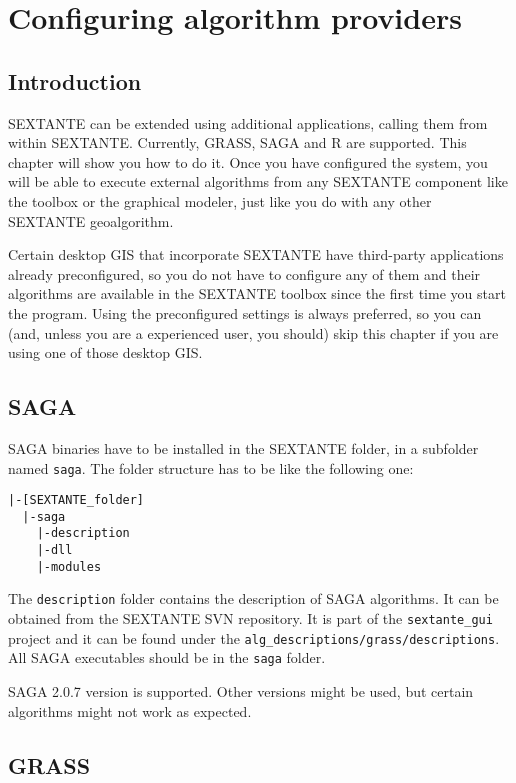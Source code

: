 \chapter{Configuring algorithm providers}

\section{Introduction}

SEXTANTE can be extended using additional applications, calling them from within SEXTANTE. Currently, GRASS, SAGA and R are supported. This chapter will show you how to do it. Once you have configured the system, you will be able to execute external algorithms from any SEXTANTE component like the toolbox or the graphical modeler, just like you do with any other SEXTANTE geoalgorithm.

Certain desktop GIS that incorporate SEXTANTE have third-party applications already preconfigured, so you do not have to configure any of them and their algorithms are available in the SEXTANTE toolbox since the first time you start the program. Using the preconfigured settings is always preferred, so you can (and, unless you are a experienced user, you should) skip this chapter if you are using one of those desktop GIS.


\section{SAGA}

SAGA binaries have to be installed in the SEXTANTE folder, in a subfolder named \texttt{saga}. The folder structure has to be like the following one:

\begin{verbatim}
|-[SEXTANTE_folder] 
  |-saga 
    |-description 
    |-dll 
    |-modules
\end{verbatim}    

The \texttt{description} folder contains the description of SAGA algorithms. It can be obtained from the SEXTANTE SVN repository. It is part of the \texttt{sextante\_gui} project and it can be found under the \texttt{alg\_descriptions/grass/descriptions}. All SAGA executables should be in the \texttt{saga} folder.

SAGA 2.0.7 version is supported. Other versions might be used, but certain algorithms might not work as expected.

\section{GRASS}

